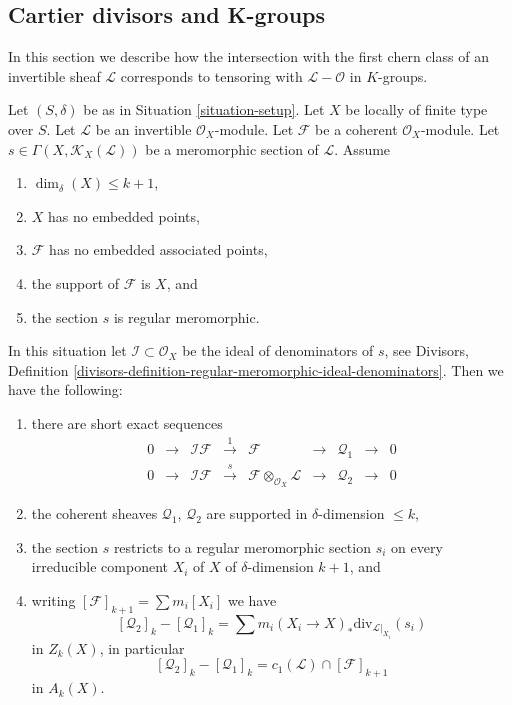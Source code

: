 \subsection{Cartier divisors and K-groups}
\label{subsection-cartier-coherent}

\noindent
In this section we describe how the intersection with the
first chern class of an invertible sheaf $\mathcal{L}$
corresponds to tensoring with $\mathcal{L} - \mathcal{O}$
in $K$-groups.

\begin{lemma}
\label{lemma-no-embedded-points}
Let $(S, \delta)$ be as in Situation \ref{situation-setup}.
Let $X$ be locally of finite type over $S$.
Let $\mathcal{L}$ be an invertible $\mathcal{O}_X$-module.
Let $\mathcal{F}$ be a coherent $\mathcal{O}_X$-module.
Let $s \in \Gamma(X, \mathcal{K}_X(\mathcal{L}))$ be a
meromorphic section of $\mathcal{L}$.
Assume
\begin{enumerate}
\item $\dim_\delta(X) \leq k + 1$,
\item $X$ has no embedded points,
\item $\mathcal{F}$ has no embedded associated points,
\item the support of $\mathcal{F}$ is $X$, and
\item the section $s$ is regular meromorphic.
\end{enumerate}
In this situation let $\mathcal{I} \subset \mathcal{O}_X$
be the ideal of denominators of $s$, see
Divisors,
Definition \ref{divisors-definition-regular-meromorphic-ideal-denominators}.
Then we have the following:
\begin{enumerate}
\item there are short exact sequences
$$
\begin{matrix}
0 &
\to &
\mathcal{I}\mathcal{F} &
\xrightarrow{1} &
\mathcal{F} &
\to &
\mathcal{Q}_1 &
\to &
0 \\
0 &
\to &
\mathcal{I}\mathcal{F} &
\xrightarrow{s} &
\mathcal{F} \otimes_{\mathcal{O}_X} \mathcal{L} &
\to &
\mathcal{Q}_2 &
\to &
0
\end{matrix}
$$
\item the coherent sheaves $\mathcal{Q}_1$, $\mathcal{Q}_2$
are supported in $\delta$-dimension $\leq k$,
\item the section $s$ restricts to a regular meromorphic
section $s_i$ on every irreducible component $X_i$ of
$X$ of $\delta$-dimension $k + 1$, and
\item writing $[\mathcal{F}]_{k + 1} = \sum m_i[X_i]$ we have
$$
[\mathcal{Q}_2]_k - [\mathcal{Q}_1]_k
=
\sum m_i(X_i \to X)_*\text{div}_{\mathcal{L}|_{X_i}}(s_i)
$$
in $Z_k(X)$, in particular
$$
[\mathcal{Q}_2]_k - [\mathcal{Q}_1]_k
=
c_1(\mathcal{L}) \cap [\mathcal{F}]_{k + 1}
$$
in $A_k(X)$.
\end{enumerate}
\end{lemma}

